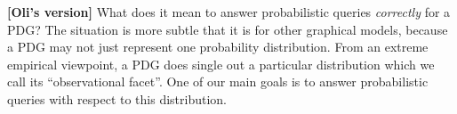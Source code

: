 \documentclass[twoside]{article}
\newcommand\obslimit{observational facet} %
\begin{document}
{\color{blue!50!black}\textbf{[Oli's version]}
What does it mean to answer probabilistic queries \emph{correctly} for a PDG?
The situation is more subtle that it is for other graphical models, because a PDG may
not just represent one probability distribution.
From an extreme empirical viewpoint,
a PDG does single out a particular distribution which we call its ``\obslimit''.
One of our main goals 
is to answer probabilistic queries with respect to this distribution.
}
\end{document}
